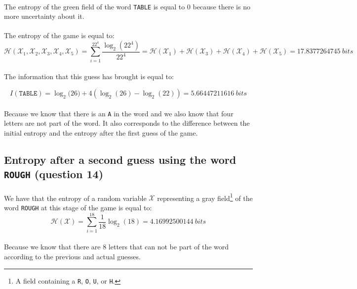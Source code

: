 \documentclass[a4paper, 11pt, oneside]{article}
\begin{document}
\paragraph{}The entropy of the green field of the word \texttt{TABLE} is equal to 0 because there is no more uncertainty about it.

\paragraph{}The entropy of the game is equal to:
$$\mathcal{H}(\mathcal{X}_1, \mathcal{X}_2, \mathcal{X}_3, \mathcal{X}_4,\mathcal{X}_5) = \sum_{i = 1}^{22^4} \frac{\log_2(22^4)}{22^4} = \mathcal{H}(\mathcal{X}_1) + \mathcal{H}(\mathcal{X}_3) + \mathcal{H}(\mathcal{X}_4) + \mathcal{H}(\mathcal{X}_5) = 17.8377264745 \ bits$$

\paragraph{}The information that this guess has brought is equal to:

$$I(\texttt{TABLE}) = \log_2{(26}) + 4 \left(\log_2{(26)} - \log_2(22)\right) = 5.66447211616 \ bits$$

\paragraph{}Because we know that there is an \texttt{A} in the word and we also know that four letters are not part of the word. It also corresponds to the difference between the initial entropy and the entropy after the first guess of the game. 

\subsection{Entropy after a second guess using the word \texttt{ROUGH} (question 14)}

\paragraph{}We have that the entropy of a random variable $\mathcal{X}$ representing a gray field\footnote{A field containing a \texttt{R}, \texttt{O}, \texttt{U}, or \texttt{H}.} of the word \texttt{ROUGH} at this stage of the game is equal to:
$$ \mathcal{H}(\mathcal{X}) = \sum_{i=1}^{18} \frac{1}{18} \log_2{(18)} = 4.16992500144\ bits $$
\paragraph{}Because we know that there are 8 letters that can not be part of the word according to the previous and actual guesses.
\end{document}
